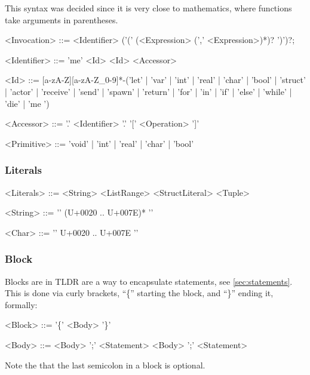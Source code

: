 This syntax was decided since it is very close to mathematics, where functions take arguments in parentheses.
\begin{grammar}
<Invocation> ::= <Identifier> ('(' (<Expression> (',' <Expression>)*)? ')')?;

<Identifier> ::= 'me'
 \alt <Id>
 \alt <Id> <Accessor>

<Id> ::= [a-zA-Z][a-zA-Z\_0-9]*-('let' | 'var' | 'int' | 'real' | 'char' | 'bool' | 'struct' | 'actor' | 'receive' | 'send' | 'spawn' | 'return' | 'for' | 'in' | 'if' | 'else' | 'while' | 'die' | 'me ')

<Accessor> ::= '.' <Identifier>
 \alt '.' '[' <Operation> ']'

<Primitive> ::= 'void' | 'int' | 'real' | 'char' | 'bool'
\end{grammar}

\subsubsection{Literals}

\begin{grammar}
<Literals> ::= <String>
 \alt <ListRange>
 \alt <StructLiteral>
 \alt <Tuple>

<String> ::= '\textquotedbl' (U+0020 .. U+007E)* '\textquotedbl'

<Char> ::= '\textquotesingle' U+0020 .. U+007E '\textquotesingle'
\end{grammar}

\subsubsection{Block}
Blocks are in TLDR are a way to encapsulate statements, see \cref{sec:statements}. This is done via curly brackets, \enquote{\{} starting the block, and \enquote{\}} ending it, formally:
\begin{grammar}
<Block> ::= '\{' <Body> '\}'

<Body> ::= <Body> ';' <Statement>
 \alt <Body> ';'
 \alt <Statement>
\end{grammar}
Note the that the last semicolon in a block is optional.

